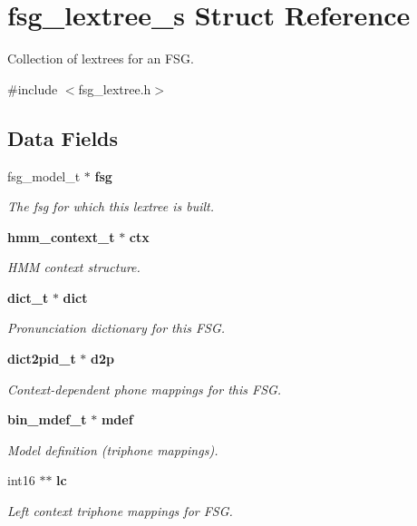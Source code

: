\section{fsg\+\_\+lextree\+\_\+s Struct Reference}
\label{structfsg__lextree__s}


Collection of lextrees for an F\+SG.  




{\ttfamily \#include $<$fsg\+\_\+lextree.\+h$>$}

\subsection*{Data Fields}
\begin{DoxyCompactItemize}
\item 
fsg\+\_\+model\+\_\+t $\ast$ \textbf{ fsg}
\begin{DoxyCompactList}\small\item\em The fsg for which this lextree is built. \end{DoxyCompactList}\item 
\textbf{ hmm\+\_\+context\+\_\+t} $\ast$ \textbf{ ctx}
\begin{DoxyCompactList}\small\item\em H\+MM context structure. \end{DoxyCompactList}\item 
\textbf{ dict\+\_\+t} $\ast$ \textbf{ dict}
\begin{DoxyCompactList}\small\item\em Pronunciation dictionary for this F\+SG. \end{DoxyCompactList}\item 
\textbf{ dict2pid\+\_\+t} $\ast$ \textbf{ d2p}
\begin{DoxyCompactList}\small\item\em Context-\/dependent phone mappings for this F\+SG. \end{DoxyCompactList}\item 
\textbf{ bin\+\_\+mdef\+\_\+t} $\ast$ \textbf{ mdef}
\begin{DoxyCompactList}\small\item\em Model definition (triphone mappings). \end{DoxyCompactList}\item 
int16 $\ast$$\ast$ \textbf{ lc}
\begin{DoxyCompactList}\small\item\em Left context triphone mappings for F\+SG. \end{DoxyCompactList}\item 
$$
\end{DoxyCompactItemize}
